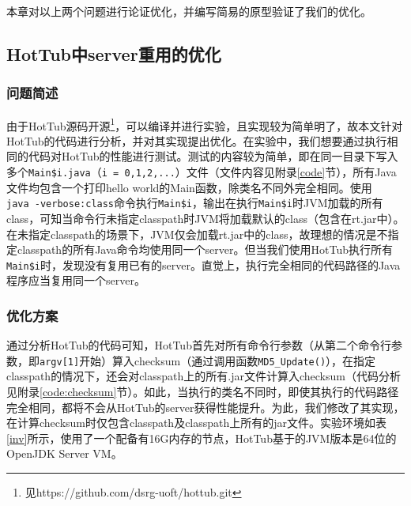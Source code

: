 \documentclass[lang=cn,12pt,a4paper,cite=authoryear]{elegantpaper}
\begin{document}
\begin{figure*}[!htp]
本章对以上两个问题进行论证优化，并编写简易的原型验证了我们的优化。

\subsection{HotTub中server重用的优化}
\subsubsection{问题简述}
由于HotTub源码开源\footnote{见https://github.com/dsrg-uoft/hottub.git}，可以编译并进行实验，且实现较为简单明了，故本文针对HotTub的代码进行分析，并对其实现提出优化。在实验中，我们想要通过执行相同的代码对HotTub的性能进行测试。测试的内容较为简单，即在同一目录下写入多个\texttt{Main\$i.java}（\texttt{i = 0,1,2,...}）文件（文件内容见附录\ref{code}节），所有Java文件均包含一个打印hello world的Main函数，除类名不同外完全相同。使用\texttt{java\ -verbose:class}命令执行\texttt{Main\$i}，输出在执行\texttt{Main\$i}时JVM加载的所有class，可知当命令行未指定classpath时JVM将加载默认的class（包含在rt.jar中）。在未指定classpath的场景下，JVM仅会加载rt.jar中的class，故理想的情况是不指定classpath的所有Java命令均使用同一个server。但当我们使用HotTub执行所有\texttt{Main\$i}时，发现没有复用已有的server。直觉上，执行完全相同的代码路径的Java程序应当复用同一个server。

\subsubsection{优化方案}
通过分析HotTub的代码可知，HotTub首先对所有命令行参数（从第二个命令行参数，即\texttt{argv[1]}开始）算入checksum（通过调用函数\texttt{MD5\_Update()}），在指定classpath的情况下，还会对classpath上的所有.jar文件计算入checksum（代码分析见附录\ref{code:checksum}节）。如此，当执行的类名不同时，即使其执行的代码路径完全相同，都将不会从HotTub的server获得性能提升。为此，我们修改了其实现，在计算checksum时仅包含classpath及classpath上所有的jar文件。实验环境如表\ref{inv}所示，使用了一个配备有16G内存的节点，HotTub基于的JVM版本是64位的OpenJDK Server VM。


\end{figure*}
\end{document}
